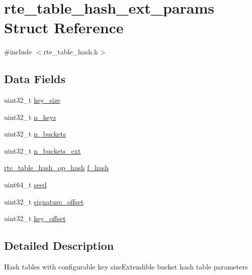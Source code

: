\hypertarget{structrte__table__hash__ext__params}{}\section{rte\+\_\+table\+\_\+hash\+\_\+ext\+\_\+params Struct Reference}
\label{structrte__table__hash__ext__params}


{\ttfamily \#include $<$rte\+\_\+table\+\_\+hash.\+h$>$}

\subsection*{Data Fields}
\begin{DoxyCompactItemize}
\item 
uint32\+\_\+t \hyperlink{structrte__table__hash__ext__params_a83844a351f4b92ad62ba71b38733aa04}{key\+\_\+size}
\item 
uint32\+\_\+t \hyperlink{structrte__table__hash__ext__params_a4c48340399424293c79db3dc411e8231}{n\+\_\+keys}
\item 
uint32\+\_\+t \hyperlink{structrte__table__hash__ext__params_a241ccfe90f415a07cad8a881fc0f83ac}{n\+\_\+buckets}
\item 
uint32\+\_\+t \hyperlink{structrte__table__hash__ext__params_a132da62c2f644cd61a43655ed0c887d7}{n\+\_\+buckets\+\_\+ext}
\item 
\hyperlink{rte__table__hash_8h_a6633f20f58e850abc3d1650af5d900da}{rte\+\_\+table\+\_\+hash\+\_\+op\+\_\+hash} \hyperlink{structrte__table__hash__ext__params_a5a7373267cebe4384507b331c883624a}{f\+\_\+hash}
\item 
uint64\+\_\+t \hyperlink{structrte__table__hash__ext__params_a13dfa5fcb8e1184f1f7756e717fd2807}{seed}
\item 
uint32\+\_\+t \hyperlink{structrte__table__hash__ext__params_a255e199334632db5019afe0eb166a05a}{signature\+\_\+offset}
\item 
uint32\+\_\+t \hyperlink{structrte__table__hash__ext__params_aa09132fc271bc1be2e4032587665bcf7}{key\+\_\+offset}
\end{DoxyCompactItemize}


\subsection{Detailed Description}
Hash tables with configurable key size\+Extendible bucket hash table parameters 

